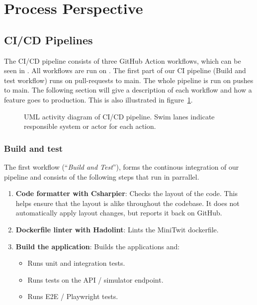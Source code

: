 \section{Process Perspective}\label{process-perspective}

\subsection{CI/CD Pipelines}\label{cicd-pipelines}
The CI/CD pipeline consists of three GitHub Action workflows, which can be seen in
. All workflows are run on
. The first part of our CI pipeline (Build and test workflow) runs on pull-requests to main. 
The whole pipeline is run on pushes to main. 
The following section will give a description of each workflow and how a feature goes to production. This is also illustrated in figure~\ref{cicd-diagram}.

\begin{figure} [H]
    \caption{UML activity diagram of CI/CD pipeline. Swim lanes indicate responsible system or actor for each action.}
    \label{cicd-diagram}
\end{figure}
\restoregeometry


\subsubsection{Build and test}\label{build-and-test}
The first workflow (``\textit{Build and Test}''), forms the continous integration of our pipeline and consists of the following steps that run in parrallel.
\begin{enumerate}
    \item \textbf{Code formatter with Csharpier}: Checks the layout of the code. 
    This helps ensure that the layout is alike throughout the codebase. It does not automatically apply layout changes, but reports it back on GitHub.
    \item \textbf{Dockerfile linter with Hadolint}: Lints the MiniTwit dockerfile.
    \item \textbf{Build the application}: Builds the applications and:
    \begin{itemize}
        \item Runs unit and integration tests.
        \item Runs tests on the API / simulator endpoint.
        \item Runs E2E / Playwright tests.
    \end{itemize}
\end{enumerate}

